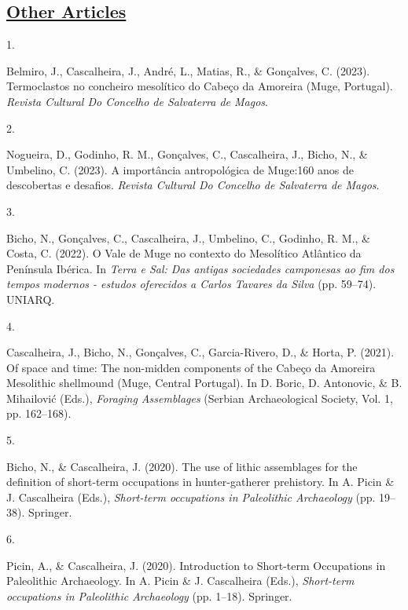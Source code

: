 \documentclass[11pt,a4paper,]{awesome-cv}
\newlength{\cslhangindent}
\newlength{\csllabelwidth}
\newenvironment{CSLReferences}[2] %
 {\begin{list}{}{%
  \setlength{\itemindent}{0pt}
  \setlength{\leftmargin}{0pt}
  \setlength{\parsep}{0pt}
  \ifodd #1
   \setlength{\leftmargin}{\cslhangindent}
   \setlength{\itemindent}{-1\cslhangindent}
  \fi
  \setlength{\itemsep}{#2\baselineskip}}}
 {\end{list}}
\newcommand{\CSLLeftMargin}[1]{\parbox[t]{\csllabelwidth}{\strut#1\strut}}
\newcommand{\CSLRightInline}[1]{\parbox[t]{\linewidth - \csllabelwidth}{\strut#1\strut}}
\begin{document}
\subsection{\texorpdfstring{\ul{Other
Articles}}{Other Articles}}\label{other-articles}

\label{refs-b327b434dae0cffc712ba6b5984a031e}
\begin{CSLReferences}{0}{0}
\CSLLeftMargin{1. }%
\CSLRightInline{Belmiro, J., Cascalheira, J., André, L., Matias, R., \&
Gonçalves, C. (2023). Termoclastos no concheiro mesolítico do Cabeço da
Amoreira (Muge, Portugal). \emph{Revista Cultural Do Concelho de
Salvaterra de Magos}.}

\CSLLeftMargin{2. }%
\CSLRightInline{Nogueira, D., Godinho, R. M., Gonçalves, C.,
Cascalheira, J., Bicho, N., \& Umbelino, C. (2023). A importância
antropológica de Muge:160 anos de descobertas e desafios. \emph{Revista
Cultural Do Concelho de Salvaterra de Magos}.}

\CSLLeftMargin{3. }%
\CSLRightInline{Bicho, N., Gonçalves, C., Cascalheira, J., Umbelino, C.,
Godinho, R. M., \& Costa, C. (2022). O Vale de Muge no contexto do
Mesolítico Atlântico da Península Ibérica. In \emph{Terra e Sal: Das
antigas sociedades camponesas ao fim dos tempos modernos - estudos
oferecidos a Carlos Tavares da Silva} (pp. 59--74). UNIARQ.}

\CSLLeftMargin{4. }%
\CSLRightInline{Cascalheira, J., Bicho, N., Gonçalves, C.,
Garcia-Rivero, D., \& Horta, P. (2021). Of space and time: The
non-midden components of the Cabeço da Amoreira Mesolithic shellmound
(Muge, Central Portugal). In D. Boric, D. Antonovic, \& B. Mihailović
(Eds.), \emph{Foraging Assemblages} (Serbian Archaeological Society,
Vol. 1, pp. 162--168).}

\CSLLeftMargin{5. }%
\CSLRightInline{Bicho, N., \& Cascalheira, J. (2020). The use of lithic
assemblages for the definition of short-term occupations in
hunter-gatherer prehistory. In A. Picin \& J. Cascalheira (Eds.),
\emph{Short-term occupations in Paleolithic Archaeology} (pp. 19--38).
Springer.}

\CSLLeftMargin{6. }%
\CSLRightInline{Picin, A., \& Cascalheira, J. (2020). Introduction to
Short-term Occupations in Paleolithic Archaeology. In A. Picin \& J.
Cascalheira (Eds.), \emph{Short-term occupations in Paleolithic
Archaeology} (pp. 1--18). Springer.}


\end{CSLReferences}
\end{document}
